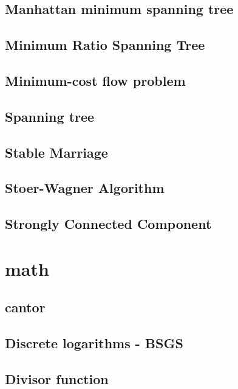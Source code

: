 \documentclass[a4paper,5pt,twocolumn,titlepage]{article}
\begin{document}
\subsection{Manhattan minimum spanning tree}

\subsection{Minimum Ratio Spanning Tree}

\subsection{Minimum-cost flow problem}

\subsection{Spanning tree}

\subsection{Stable Marriage}

\subsection{Stoer-Wagner Algorithm}

\subsection{Strongly Connected Component}

\section{math}
\subsection{cantor}

\subsection{Discrete logarithms - BSGS}

\subsection{Divisor function}

\end{document}
